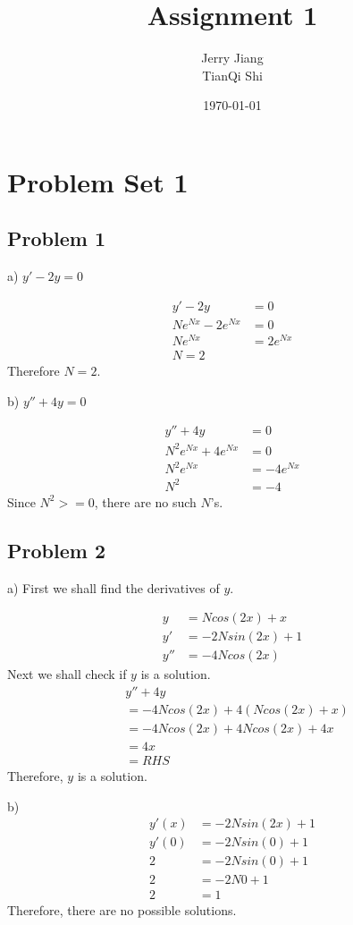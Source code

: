 \documentclass[titlepage]{article}
\title{Assignment 1}
\date{\today}
\author{Jerry Jiang\\ TianQi Shi}
\begin{document}
\maketitle

\noindent
\section{Problem Set 1}
\subsection{Problem 1}
a) $y' - 2y = 0$

\begin{align*}
  y' - 2y &= 0
  \\ Ne^{Nx} - 2e^{Nx} &= 0
  \\ Ne^{Nx} &= 2e^{Nx}
  \\ N = 2
\end{align*}
Therefore $N = 2$.

\vspace{1em}
\noindent
b) $y'' + 4y = 0$

\begin{align*}
  y'' + 4y &= 0
  \\ N^2e^{Nx} + 4e^{Nx} &= 0
  \\ N^2e^{Nx} &= -4e^{Nx}
  \\ N^2 &= -4
\end{align*}
Since $N^2 >= 0$, there are no such $N$'s.

\subsection{Problem 2}

a) First we shall find the derivatives of $y$.

\begin{align*}
  y &= Ncos(2x) + x
  \\ y' &= -2Nsin(2x) + 1
  \\ y'' &= -4Ncos(2x)
\end{align*}
Next we shall check if $y$ is a solution.
\begin{align*}
  &y'' + 4y
  \\ &= -4Ncos(2x) + 4(Ncos(2x) + x)
  \\ &= -4Ncos(2x) + 4Ncos(2x) + 4x
  \\ &= 4x
  \\ &= RHS
\end{align*}
Therefore, $y$ is a solution.

\vspace{1em}
\noindent
b)
\begin{align*}
  y'(x) &= -2Nsin(2x) + 1
  \\ y'(0) &= -2Nsin(0) + 1
  \\ 2 &= -2Nsin(0) + 1
  \\ 2 &= -2N0 + 1
  \\ 2 &= 1
\end{align*}
Therefore, there are no possible solutions.
\end{document}
